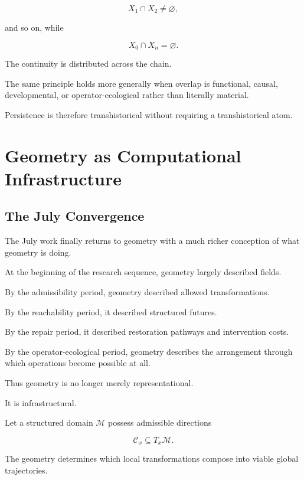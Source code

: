 \documentclass[11pt]{article}
\theoremstyle{remark}
\begin{document}
\begin{equation}
X_1\cap X_2\neq\varnothing,
\end{equation}

and so on, while

\begin{equation}
X_0\cap X_n=\varnothing.
\end{equation}

The continuity is distributed across the chain.

The same principle holds more generally when overlap is functional, causal, developmental, or operator-ecological rather than literally material.

Persistence is therefore transhistorical without requiring a transhistorical atom.

\section{Geometry as Computational Infrastructure}

\subsection{The July Convergence}

The July work finally returns to geometry with a much richer conception of what geometry is doing.

At the beginning of the research sequence, geometry largely described fields.

By the admissibility period, geometry described allowed transformations.

By the reachability period, it described structured futures.

By the repair period, it described restoration pathways and intervention costs.

By the operator-ecological period, geometry describes the arrangement through which operations become possible at all.

Thus geometry is no longer merely representational.

It is infrastructural.

Let a structured domain $\mathcal{M}$ possess admissible directions

\begin{equation}
\mathcal{C}_x\subseteq T_x\mathcal{M}.
\end{equation}

The geometry determines which local transformations compose into viable global trajectories.
\end{document}
